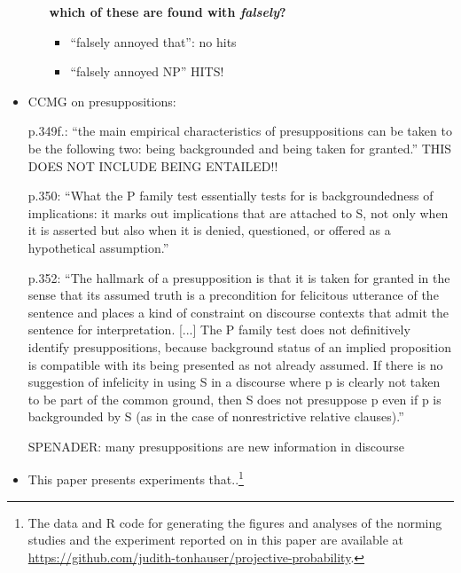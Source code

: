 \documentclass[11pt,fleqn]{article}
\newcommand{\6}{\mbox{$[\hspace*{-.6mm}[$}}
\newcommand{\9}{\mbox{$]\hspace*{-.6mm}]$}}
\begin{document}
\begin{itemize}
\begin{itemize}
{\bf which of these are found with {\em falsely}?}

\begin{itemize}

\item ``falsely annoyed that'': no hits

\item ``falsely annoyed NP'' HITS!


\end{itemize}

\end{itemize}


\item CCMG on presuppositions:

p.349f.: ``the main empirical characteristics of presuppositions can be taken to be the following two: being backgrounded and being taken for granted.'' THIS DOES NOT INCLUDE BEING ENTAILED!! 

p.350: ``What the P family test essentially tests for is backgroundedness of implications: it marks out implications that are attached to S, not only when it is asserted but also when it is denied, questioned, or offered as a hypothetical assumption.''

p.352: ``The hallmark of a presupposition is that it is taken for granted in the sense that its assumed truth is a precondition for felicitous utterance of the sentence and places a kind of constraint on discourse contexts that admit the sentence for interpretation. [...] The P family test does not definitively identify presuppositions, because background status of an implied proposition is compatible with its being presented as not already assumed. If there is no suggestion of infelicity in using S in a discourse where p is clearly not taken to be part of the common ground, then S does not presuppose p even if p is backgrounded by S (as in the case of nonrestrictive relative clauses).''

SPENADER: many presuppositions are new information in discourse 

\item This paper presents experiments that..\footnote{\label{f-github}The
data and R code for generating the figures and analyses
of the norming studies and the experiment reported on in this paper are available at \url{https://github.com/judith-tonhauser/projective-probability}.}

\end{itemize}

\newpage
\end{document}
